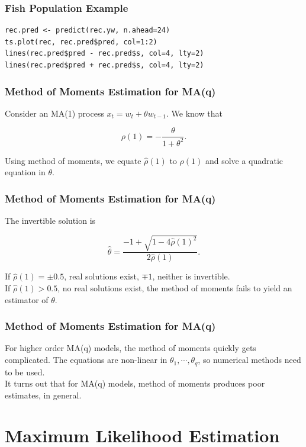 \documentclass[%
xcolor=pdftex]{beamer}
\begin{document}
\begin{frame}[fragile]
\frametitle{Fish Population Example}

\begin{verbatim}
rec.pred <- predict(rec.yw, n.ahead=24)
ts.plot(rec, rec.pred$pred, col=1:2)
lines(rec.pred$pred - rec.pred$s, col=4, lty=2)
lines(rec.pred$pred + rec.pred$s, col=4, lty=2)
\end{verbatim}

\end{frame}

\begin{frame}
\frametitle{Method of Moments Estimation for MA(q)}

Consider an MA(1) process $x_t = w_t + \theta w_{t-1}$. We know that

$$
\rho(1) = -\frac{\theta}{1 + \theta^2}.
$$

Using method of moments, we equate $\hat{\rho}(1)$ to $\rho(1)$ and solve a quadratic equation in $\theta$.


\end{frame}

\begin{frame}
\frametitle{Method of Moments Estimation for MA(q)}

The invertible solution is

$$
\hat{\theta} = \frac{-1 + \sqrt{1 - 4 \hat{\rho}(1)^2}}{2 \hat{\rho}(1)}.
$$

If $\hat{\rho}(1)= \pm 0.5$, real solutions exist, $\mp 1$, neither is invertible. \\
If $\hat{\rho}(1)>0.5$, no real solutions exist, the method of moments fails to yield an estimator of $\theta$.

\end{frame}

\begin{frame}
\frametitle{Method of Moments Estimation for MA(q)}

For higher order MA(q) models, the method of moments quickly gets complicated. The equations are non-linear in $\theta_1, \cdots, \theta_q$, so numerical methods need to be used. \\
\vspace{5mm}
It turns out that for MA(q) models, method of moments produces poor estimates, in general.
\end{frame}

\section{Maximum Likelihood Estimation}
\frame{\tableofcontents[currentsection]}
\end{document}
